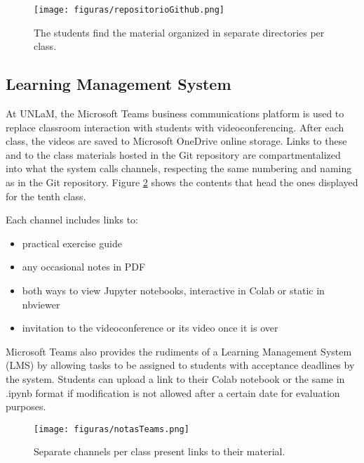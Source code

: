 \begin{figure}[!ht]
\centering
\texttt{[image: figuras/repositorioGithub.png]}
\caption{The students find the material organized in separate directories per class.}
\label{fig:github}
\end{figure}

\subsection{Learning Management System}

At UNLaM, the Microsoft Teams business communications platform is used to replace classroom interaction with students with videoconferencing. After each class, the videos are saved to Microsoft OneDrive online storage. Links to these and to the class materials hosted in the Git repository are compartmentalized into what the system calls channels, respecting the same numbering and naming as in the Git repository. Figure \ref{fig:teams} shows the contents that head the ones displayed for the tenth class.

Each channel includes links to:
\begin{itemize}
    \item practical exercise guide
    \item any occasional notes in PDF
    \item both ways to view Jupyter notebooks, interactive in Colab or static in nbviewer
    \item invitation to the videoconference or its video once it is over
\end{itemize}

Microsoft Teams also provides the rudiments of a Learning Management System (LMS) by allowing tasks to be assigned to students with acceptance deadlines by the system. Students can upload a link to their Colab notebook or the same in .ipynb format if modification is not allowed after a certain date for evaluation purposes.

\begin{figure}[!ht]
\centering
\texttt{[image: figuras/notasTeams.png]}
\caption{Separate channels per class present links to their material.}
\label{fig:teams}
\end{figure}




















